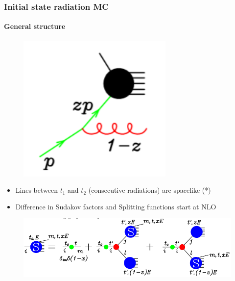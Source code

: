\documentclass[aspectratio=43]{beamer}
\begin{document}
\begin{frame}

	\frametitle{Initial state radiation MC}
	\framesubtitle{General structure}
	
	\begin{figure}
		\includegraphics[width = 3 cm]{plots/shower_ISR_0.png}
	\end{figure}
	
	\begin{itemize} 
		\item Lines between $t_{1}$ and $t_{2}$ (consecutive radiations) are spacelike {\color{blue}(*)}
		\item Difference in Sudakov factors and Splitting functions start at NLO
	\end{itemize}
	
	\begin{figure}
		\includegraphics[width = 10 cm]{plots/shower_ISR_3.png}
	\end{figure}

\end{frame}
\end{document}
